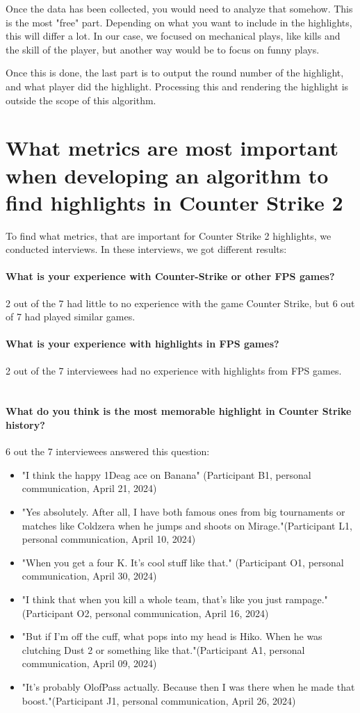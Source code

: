 Once the data has been collected, you would need to analyze that somehow. This is the most "free" part. Depending on what you want to include in the highlights, this will differ a lot. In our case, we focused on mechanical plays, like kills and the skill of the player, but another way would be to focus on funny plays.

Once this is done, the last part is to output the round number of the highlight, and what player did the highlight. Processing this and rendering the highlight is outside the scope of this algorithm.
\section{What metrics are most important when developing an algorithm to find highlights in Counter Strike 2}
To find what metrics, that are important for Counter Strike 2 highlights, we conducted interviews. In these interviews, we got different results:
\paragraph{What is your experience with Counter-Strike or other FPS games?}
2 out of the 7 had little to no experience with the game Counter Strike, but 6 out of 7 had played similar games.
\paragraph{What is your experience with highlights in FPS games?}
2 out of the 7 interviewees had no experience with highlights from FPS games.\\\\
\paragraph{What do you think is the most memorable highlight in Counter Strike history?}
6 out the 7 interviewees answered this question:
\begin{itemize}
    \item "I think the happy 1Deag ace on Banana" (Participant B1, personal communication, April 21, 2024)
    \item "Yes absolutely. After all, I have both famous ones from big tournaments or matches like Coldzera when he jumps and shoots on Mirage."(Participant L1, personal communication, April 10, 2024)
    \item "When you get a four K. It's cool stuff like that." (Participant O1, personal communication, April 30, 2024)
    \item "I think that when you kill a whole team, that's like you just rampage." (Participant O2, personal communication, April 16, 2024)
    \item "But if I'm off the cuff, what pops into my head is Hiko. When he was clutching Dust 2 or something like that."(Participant A1, personal communication, April 09, 2024)
    \item "It's probably OlofPass actually. Because then I was there when he made that boost."(Participant J1, personal communication, April 26, 2024)
\end{itemize}

